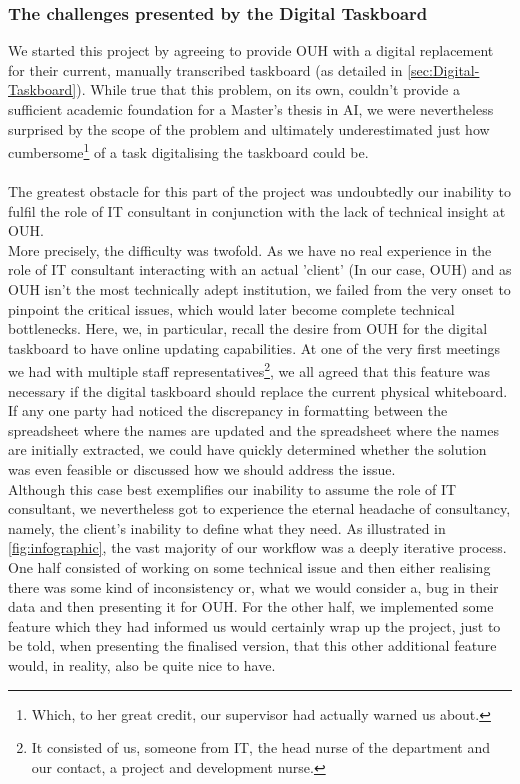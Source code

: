 \subsubsection*{The challenges presented by the Digital Taskboard}
We started this project by agreeing to provide OUH with a digital replacement for their current, manually transcribed taskboard (as detailed in \autoref{sec:Digital-Taskboard}). While true that this problem, on its own, couldn't provide a sufficient academic foundation for a Master's thesis in AI, we were nevertheless surprised by the scope of the problem and ultimately underestimated just how cumbersome\footnote{Which, to her great credit, our supervisor had actually warned us about.} of a task digitalising the taskboard could be.
\\
\\
The greatest obstacle for this part of the project was undoubtedly our inability to fulfil the role of IT consultant in conjunction with the lack of technical insight at OUH.
\\
More precisely, the difficulty was twofold. As we have no real experience in the role of IT consultant interacting with an actual 'client' (In our case, OUH) and as OUH isn't the most technically adept institution, we failed from the very onset to pinpoint the critical issues, which would later become complete technical bottlenecks. Here, we, in particular, recall the desire from OUH for the digital taskboard to have online updating capabilities. At one of the very first meetings we had with multiple staff representatives\footnote{It consisted of us, someone from IT, the head nurse of the department and our contact, a project and development nurse.}, we all agreed that this feature was necessary if the digital taskboard should replace the current physical whiteboard. If any one party had noticed the discrepancy in formatting between the spreadsheet where the names are updated and the spreadsheet where the names are initially extracted, we could have quickly determined whether the solution was even feasible or discussed how we should address the issue.
\\
Although this case best exemplifies our inability to assume the role of IT consultant, we nevertheless got to experience the eternal headache of consultancy, namely, the client's inability to define what they need. As illustrated in \autoref{fig:infographic}, the vast majority of our workflow was a deeply iterative process. One half consisted of working on some technical issue and then either realising there was some kind of inconsistency or, what we would consider a, bug in their data and then presenting it for OUH. For the other half, we implemented some feature which they had informed us would certainly wrap up the project, just to be told, when presenting the finalised version, that this other additional feature would, in reality, also be quite nice to have.
